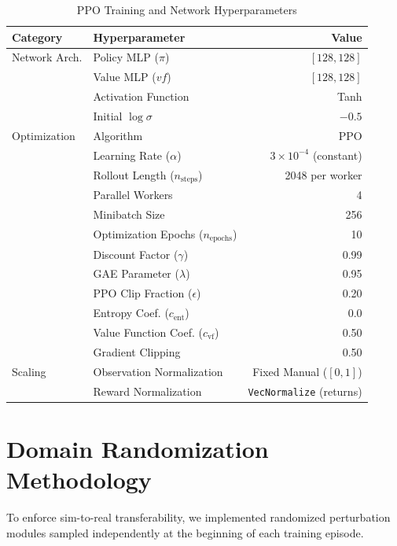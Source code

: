 \documentclass[conference]{IEEEtran}
\begin{document}
\begin{table}[t]
\caption{PPO Training and Network Hyperparameters}
\centering
\begin{tabular}{llr}
\toprule
\textbf{Category} & \textbf{Hyperparameter} & \textbf{Value} \\
\midrule
Network Arch. & Policy MLP ($\pi$) & $[128, 128]$ \\
              & Value MLP ($vf$) & $[128, 128]$ \\
              & Activation Function & Tanh \\
              & Initial $\log \sigma$ & $-0.5$ \\
\midrule
Optimization  & Algorithm & PPO \cite{schulman2017proximal} \\
              & Learning Rate ($\alpha$) & $3 \times 10^{-4}$ (constant) \\
              & Rollout Length ($n_{\text{steps}}$) & 2048 per worker \\
              & Parallel Workers & 4 \\
              & Minibatch Size & 256 \\
              & Optimization Epochs ($n_{\text{epochs}}$) & 10 \\
              & Discount Factor ($\gamma$) & 0.99 \\
              & GAE Parameter ($\lambda$) & 0.95 \\
              & PPO Clip Fraction ($\epsilon$) & 0.20 \\
              & Entropy Coef. ($c_{\text{ent}}$) & 0.0 \\
              & Value Function Coef. ($c_{\text{vf}}$) & 0.50 \\
              & Gradient Clipping & 0.50 \\
\midrule
Scaling       & Observation Normalization & Fixed Manual ($[0, 1]$) \\
              & Reward Normalization & \texttt{VecNormalize} (returns) \\
\bottomrule
\end{tabular}
\label{tab:hyperparams}
\end{table}

\section{Domain Randomization Methodology}
To enforce sim-to-real transferability, we implemented randomized perturbation modules sampled independently at the beginning of each training episode.
\end{document}
